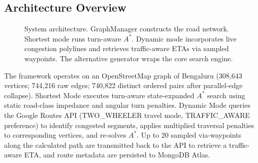 \documentclass[11pt,conference]{IEEEtran}
\begin{document}
\subsection{Architecture Overview}

\begin{figure}[t]
\centering
{}
\caption{System architecture. GraphManager constructs the road network. Shortest mode runs turn-aware $A^*$. Dynamic mode incorporates live congestion polylines and retrieves traffic-aware ETAs via sampled waypoints. The alternative generator wraps the core search engine.}
\label{fig:architecture}
\end{figure}

The framework operates on an OpenStreetMap graph of Bengaluru (308,643 vertices; 744,216 raw edges; 740,822 distinct ordered pairs after parallel-edge collapse).
Shortest Mode executes turn-aware state-expanded $A^*$ search using static road-class impedance and angular turn penalties.
Dynamic Mode queries the Google Routes API (TWO\_WHEELER travel mode, TRAFFIC\_AWARE preference) to identify congested segments, applies multiplied traversal penalties to corresponding vertices, and re-solves $A^*$.
Up to 20 sampled via-waypoints along the calculated path are transmitted back to the API to retrieve a traffic-aware ETA, and route metadata are persisted to MongoDB Atlas.
\end{document}
